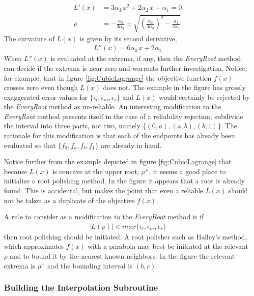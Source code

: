 \begin{align*}
L'(x) &= 3\alpha_3\,x^2 + 2\alpha_2\,x + \alpha_1  = 0\\
\rho &=  -\frac{\alpha_2}{3\alpha_3} \pm \sqrt{\left(\frac{\alpha_2}{3\alpha_3}\right)^2-\frac{\alpha_1}{3\alpha_3}}
\end{align*}
The curvature of $L(x)$ is given by its second derivative,
\begin{align*}
L''(x) = 6\alpha_3\,x + 2\alpha_2
\end{align*}
When $L''(x)$ is evaluated at the extrema, if any, then the \emph{EveryRoot} method can decide if the extrema is near zero and warrents further investigation. Notice, for example, that in figure \ref{fig:CubicLagrange} the objective function $f(x)$ crosses zero even though $L(x)$ does not. The example in the figure has grossly exaggerated error values for $\{\epsilon_l, \epsilon_m, \epsilon_r\}$ and $L(x)$ would certainly be rejected by the \emph{EveryRoot} method as un-reliable. An interesting modification to the \emph{EveryRoot} method presents itself in the case of a reliability rejection; subdivide the interval into three parts, not two, namely $\{(0,a),(a,b),(b,1)\}$. The rationale for this modification is that each of the endpoints has already been evaluated so that $\{f_0, f_a, f_b, f_1\}$ are already in hand.

Notice further from the example depicted in figure \ref{fig:CubicLagrange} that because $L(x)$ is concave at the upper root, $\rho^+$, it seems a good place to initialize a root polishing method. In the figure it appears that a root is already found. This is accidental, but makes the point that even a reliable $L(x)$ should not be taken as a duplicate of the objective $f(x)$.

A rule to consider as a modification to the \emph{EveryRoot} method is if
\begin{align*}
|L(\rho)| < max\{\epsilon_l, \epsilon_m, \epsilon_r\}
\end{align*}
then root polishing should be initiated. A root polisher such as Halley's method, which approximates $f(x)$ with a parabola may best be initiated at the relevant $\rho$ and to bound it by the nearest known neighbors. In the figure the relevant extrema is $\rho^+$ and the bounding interval is $(b,r)$.

\subsubsection{Building the Interpolation Subroutine}

